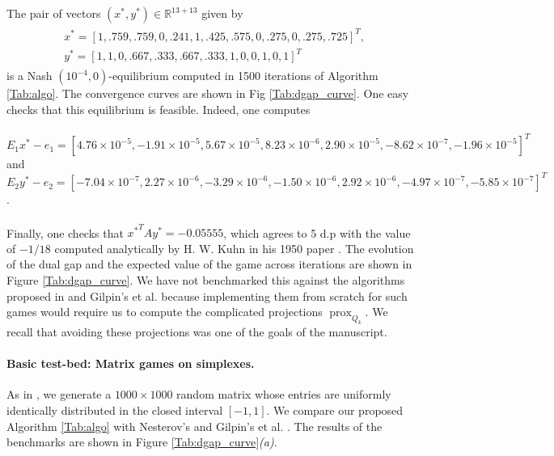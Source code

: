 \documentclass[a4paper,9pt]{extarticle}
\DeclareMathOperator{\prox}{prox}
\begin{document}
The pair of vectors $(x^*, y^*) \in \mathbb{R}^{13 + 13}$ given by
\begin{eqnarray*}
  \begin{split}
    &x^* = [1, .759, .759, 0, .241, 1, .425, .575, 0, .275, 0,
      .275, .725]^T,\\
    &y^* = [1, 1, 0, .667, .333, .667, .333, 1, 0, 0, 1, 0, 1]^T
    \end{split}
\end{eqnarray*}
is a Nash $(10^{-4},0)$-equilibrium computed in 1500 iterations of
Algorithm  \ref{Tab:algo}. The convergence curves are shown
in Fig \ref{Tab:dgap_curve}. One easy checks that this equilibrium is
feasible. Indeed, one computes \\\\
$E_1x^* - e_1 = [4.76 \times 10^{-5}, -1.91 \times 10^{-5}, 5.67
      \times 10^{-5}, 8.23 \times 10^{-6}, 2.90 \times 10^{-5},
      -8.62 \times 10^{-7}, -1.96 \times 10^{-5}]^T$
and
$E_2y^* - e_2 = [-7.04 \times 10^{-7}, 2.27 \times 10^{-6}, -3.29
  \times 10^{-6}, -1.50 \times 10^{-6},
      2.92 \times 10^{-6}, -4.97 \times 10^{-7}, -5.85 \times
      10^{-7}]^T$.\\\\
Finally, one checks that ${x^*}^TAy^* = {-0.05555}$,
 which agrees to 5 d.p with the value of $-1 / 18$ computed
 analytically by H. W. Kuhn in his 1950 paper \cite{kuhn}. The
 evolution of the dual gap and the expected value of
 the game across iterations are shown in Figure \ref{Tab:dgap_curve}.
We have not benchmarked this against the algorithms proposed in
\cite{nesterov2005a} and Gilpin's et al. \cite{gilpinfirst} because
implementing them from scratch for such games would require us to
compute the complicated projections $\prox_{Q_k}$.  We recall that
avoiding these projections was one of the goals of the manuscript.


\paragraph*{Basic test-bed: Matrix games on simplexes.}
As in \cite{nesterov2005a,chambolle2014ergodic}, we generate a $1000
\times 1000$ random matrix whose entries are uniformly identically
distributed in the closed interval $[-1, 1]$. We compare our proposed
Algorithm \ref{Tab:algo} with Nesterov's \cite{nesterov2005a} and
Gilpin's et al. \cite{gilpinfirst}. The results of the benchmarks are
shown in Figure \ref{Tab:dgap_curve}\textit{(a)}.
\end{document}
